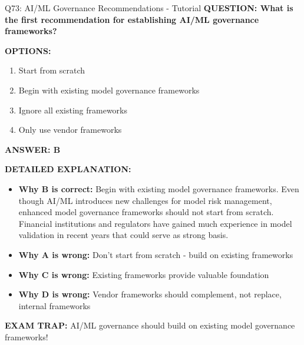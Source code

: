 \documentclass[8pt]{beamer}
\begin{document}
	\begin{frame}{Q73: AI/ML Governance Recommendations - Tutorial}
		\fontsize{6.5}{7.5}\selectfont
		\textbf{QUESTION: What is the first recommendation for establishing AI/ML governance frameworks?}
		
		\vspace{0.1cm}
		\textbf{OPTIONS:}
		\begin{enumerate}
			\item Start from scratch
			\item Begin with existing model governance frameworks
			\item Ignore all existing frameworks
			\item Only use vendor frameworks
		\end{enumerate}
		
		\vspace{0.1cm}
		\textcolor{myblue}{\textbf{ANSWER: B}}
		
		\vspace{0.1cm}
		\textbf{DETAILED EXPLANATION:}
		\begin{itemize}
			\item \textbf{Why B is correct:} Begin with existing model governance frameworks. Even though AI/ML introduces new challenges for model risk management, enhanced model governance frameworks should not start from scratch. Financial institutions and regulators have gained much experience in model validation in recent years that could serve as strong basis.
			\item \textbf{Why A is wrong:} Don't start from scratch - build on existing frameworks
			\item \textbf{Why C is wrong:} Existing frameworks provide valuable foundation
			\item \textbf{Why D is wrong:} Vendor frameworks should complement, not replace, internal frameworks
		\end{itemize}
		
		\textcolor{myred}{\textbf{EXAM TRAP:}} AI/ML governance should \textcolor{myblue}{build on existing model governance frameworks}!
	\end{frame}
	
\end{document}
